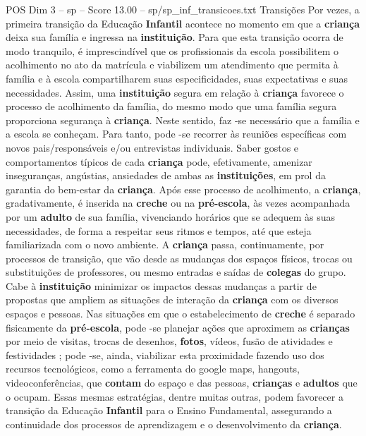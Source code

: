 \begin{textsample}{POS Dim 3 – sp – Score 13.00 – sp/sp\_inf\_transicoes.txt}  \label{ex:f3_pos_209}
Transições Por vezes, a primeira transição da Educação \textbf{Infantil} acontece no momento em que a \textbf{criança} deixa sua família e ingressa na \textbf{instituição}.
Para que esta transição ocorra de modo tranquilo, é imprescindível que os profissionais da escola possibilitem o acolhimento no ato da matrícula e viabilizem um atendimento que permita à família e à escola compartilharem suas especificidades, suas expectativas e suas necessidades.
Assim, uma \textbf{instituição} segura em relação à \textbf{criança} favorece o processo de acolhimento da família, do mesmo modo que uma família segura proporciona segurança à \textbf{criança}.
Neste sentido, faz -se necessário que a família e a escola se conheçam.
Para tanto, pode -se recorrer às reuniões específicas com novos pais/responsáveis e/ou entrevistas individuais.
Saber gostos e comportamentos típicos de cada \textbf{criança} pode, efetivamente, amenizar inseguranças, angústias, ansiedades de ambas as \textbf{instituições}, em prol da garantia do bem-estar da \textbf{criança}.
Após esse processo de acolhimento, a \textbf{criança}, gradativamente, é inserida na \textbf{creche} ou na \textbf{pré-escola}, às vezes acompanhada por um \textbf{adulto} de sua família, vivenciando horários que se adequem às suas necessidades, de forma a respeitar seus ritmos e tempos, até que esteja familiarizada com o novo ambiente.
A \textbf{criança} passa, continuamente, por processos de transição, que vão desde as mudanças dos espaços físicos, trocas ou substituições de professores, ou mesmo entradas e saídas de \textbf{colegas} do grupo.
Cabe à \textbf{instituição} minimizar os impactos dessas mudanças a partir de propostas que ampliem as situações de interação da \textbf{criança} com os diversos espaços e pessoas.
Nas situações em que o estabelecimento de \textbf{creche} é separado fisicamente da \textbf{pré-escola}, pode -se planejar ações que aproximem as \textbf{crianças} por meio de visitas, trocas de desenhos, \textbf{fotos}, vídeos, fusão de atividades e festividades ; pode -se, ainda, viabilizar esta proximidade fazendo uso dos recursos tecnológicos, como a ferramenta do google maps, hangouts, videoconferências, que \textbf{contam} do espaço e das pessoas, \textbf{crianças} e \textbf{adultos} que o ocupam.
Essas mesmas estratégias, dentre muitas outras, podem favorecer a transição da Educação \textbf{Infantil} para o Ensino Fundamental, assegurando a continuidade dos processos de aprendizagem e o desenvolvimento da \textbf{criança}.

\end{textsample}
